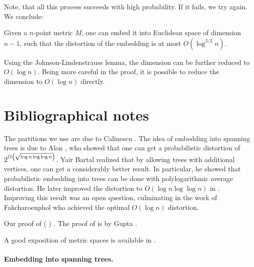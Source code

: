 Note, that all this process succeeds with high probability. If it
fails, we try again.  We conclude:

\begin{theorem}
    Given a $n$-point metric $M$, one can embed it into Euclidean
    space of dimension $n-1$, such that the distortion of the
    embedding is at most $O(\log^{3/2} n)$.
\end{theorem}

Using the Johnson-Lindenstrauss lemma, the dimension can be further
reduced to $O(\log n)$. Being more careful in the proof, it is
possible to reduce the dimension to $O(\log n)$ directly.



\section{Bibliographical notes}

The partitions we use are due to Calinescu \etal{}
\cite{ckr-aazep-04}. The idea of embedding into spanning trees is due
to Alon \etal{} \cite{akpw-gtgak-95}, who showed that one can get a
probabilistic distortion of $2^{O \pth{\sqrt{\log n \log \log n}}}$.
Yair Bartal realized that by allowing trees with additional vertices,
one can get a considerably better result. In particular, he showed
\cite{b-pamsa-96} that probabilistic embedding into trees can be done
with polylogarithmic average distortion. He later improved the
distortion to $O( \log n \log \log n)$ in \cite{b-aamtm-98}. Improving
this result was an open question, culminating in the work of
Fakcharoenphol \etal{} \cite{frt-tbaam-04} who achieved the optimal
$O(\log n)$ distortion.

Our proof of  (
\cite{frt-tbaam-04}) \cite{klmn-mdnem-05}. The proof of
 is by Gupta \cite{g-efm-00}.

A good exposition of metric spaces is available in \Matousek{}
\cite{m-ldg-02}. 


\paragraph*{Embedding into spanning trees.}

